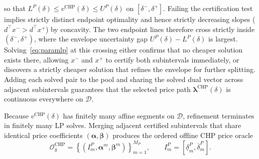 \documentclass[journal]{IEEEtran}
\newcommand{\blambda}{\bm\lambda}
\newcommand{\CHP}{\mathrm{CHP}}
\begin{document}
so that $L^P(\delta)\le v^{\CHP}(\delta)\le U^P(\delta)$ on $[\delta^-,\delta^+]$. Failing the certification test implies strictly distinct endpoint optimality and hence strictly decreasing slopes ($d^\top x^->d^\top x^+$) by concavity. The two endpoint lines therefore cross strictly inside $(\delta^-,\delta^+)$, where the envelope uncertainty gap $U^P(\delta)-L^P(\delta)$ is largest. Solving~\eqref{eq:paramlp} at this crossing either confirms that no cheaper solution exists there, allowing $x^-$ and $x^+$ to certify both subintervals immediately, or discovers a strictly cheaper solution that refines the envelope for further splitting. Adding each solved pair to the pool and sharing the solved dual vector across adjacent subintervals guarantees that the selected price path $\blambda^{\CHP}(\delta)$ is continuous everywhere on $\mathcal{D}$.


Because $v^{\CHP}(\delta)$ has finitely many affine segments on $\mathcal{D}$, refinement terminates in finitely many LP solves. Merging adjacent certified subintervals that share identical price coefficients $(\bm{\alpha},\bm{\beta})$ produces the ordered offline CHP price oracle
\begin{equation}
\mathcal{O}_g^{\CHP} = \left\{ \left(I_m^P,\bm{\alpha}^m,\bm{\beta}^m\right) \right\}_{m=1}^{M_P}, \qquad I_m^P = [\underline{\delta}_m^P,\overline{\delta}_m^P].\label{eq:price-oracle}
\end{equation}
\end{document}
